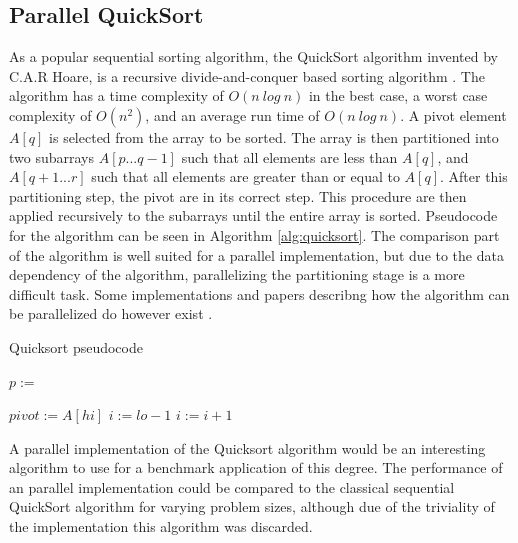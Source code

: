 \subsection{Parallel QuickSort}
As a popular sequential sorting algorithm, the QuickSort algorithm invented by C.A.R  Hoare, is a recursive divide-and-conquer based sorting algorithm \cite{hoare1962quicksort}. The algorithm has a time complexity of $O(n \ log \ n)$ in the best case, a worst case complexity of $O(n^2)$, and an average run time of $O(n \ log \ n)$. A pivot element $A[q]$ is selected from the array to be sorted. The array is then partitioned into two subarrays $A[p...q-1]$ such that all elements are less than $A[q]$, and $A[q+1...r]$ such that all elements are greater than or equal to $A[q]$. After this partitioning step, the pivot are in its correct step. This procedure are then applied recursively to the subarrays until the entire array is sorted. Pseudocode for the algorithm can be seen in Algorithm \ref{alg:quicksort}. The comparison part of the algorithm is well suited for a parallel implementation, but due to the data dependency of the algorithm, parallelizing the partitioning stage is a more difficult task. Some implementations and papers describng how the algorithm can be parallelized do however exist \cite{cederman2009gpu}\cite{sanders1997efficient}\cite{chen2009fast}.

\begin{algorithm}
    \caption{Quicksort pseudocode}
    \label{alg:quicksort}
    \begin{algorithmic}[1]
                \State $p:=$ 
            	\State {}
            	\State {}
            \EndIf
        \EndProcedure
        
            \State $pivot := A[hi]$
            \State $i := lo - 1$
                    \State $i := i + 1$
                    \State {}
                \EndIf
            \EndFor
                \State {}
            \EndIf
        \EndProcedure
    \end{algorithmic}
\end{algorithm}

A parallel implementation of the Quicksort algorithm would be an interesting algorithm to use for a benchmark application of this degree. The performance of an parallel implementation could be compared to the classical sequential QuickSort algorithm for varying problem sizes, although due of the triviality of the implementation this algorithm was discarded.

